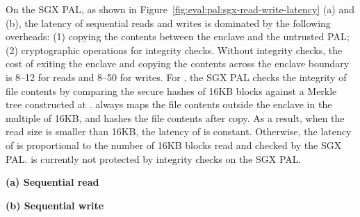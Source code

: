 On the SGX PAL, as shown in
Figure~\ref{fig:eval:pal:sgx-read-write-latency} (a) and (b), the latency of sequential reads and writes
is dominated by the following overheads:
(1) copying the contents between the enclave and the untrusted PAL; (2) cryptographic operations for 
integrity checks. Without integrity checks,
the cost of exiting the enclave
and copying the contents across the enclave boundary is
8--12 \usec{} for reads and 8--50 \usec{} for writes.
For ,
the SGX PAL checks the integrity of file contents
by comparing the secure hashes of 16KB blocks
against a Merkle tree constructed at .
always maps the file contents outside the enclave
in the multiple of 16KB,
and hashes the file contents after copy.
As a result, when the read size is smaller than 16KB,
the latency of  is constant.
Otherwise,
the latency of 
is proportional to the number of 16KB blocks read and checked by the SGX PAL.
 is currently not protected by integrity checks on the SGX PAL.



\begin{figure*}[t!]
\centering
\footnotesize
{}
\parbox{0.49\textwidth}{\centering\bf (a) Sequential read}
\parbox{0.49\textwidth}{\centering\bf (b) Sequential write}
\caption{Latency of sequential  and  on the SGX PAL,
versus the Linux PAL and Linux.
Lower is better.
Figure (a) and (b) respectively compares  and  on the SGX PAL,
with and without integrity checks ({\bf +CHK})
and reference monitor ({\bf +RM}), against the Linux PAL and  and  on Linux. The current design does not support integrity checks for .}
\label{fig:eval:pal:sgx-read-write-latency}
\end{figure*}









